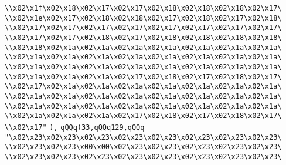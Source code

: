 \verb|\\x02\x1f\x02\x18\x02\x17\x02\x17\x02\x18\x02\x18\x02\x18\x02\x17\|\newline
\verb|\\x02\x1e\x02\x17\x02\x18\x02\x18\x02\x17\x02\x18\x02\x17\x02\x18\|\newline
\verb|\\x02\x17\x02\x17\x02\x17\x02\x17\x02\x17\x02\x17\x02\x17\x02\x17\|\newline
\verb|\\x02\x17\x02\x17\x02\x18\x02\x17\x02\x18\x02\x18\x02\x18\x02\x18\|\newline
\verb|\\x02\x18\x02\x1a\x02\x1a\x02\x1a\x02\x1a\x02\x1a\x02\x1a\x02\x1a\|\newline
\verb|\\x02\x1a\x02\x1a\x02\x1a\x02\x1a\x02\x1a\x02\x1a\x02\x1a\x02\x1a\|\newline
\verb|\\x02\x1a\x02\x1a\x02\x1a\x02\x1a\x02\x1a\x02\x1a\x02\x1a\x02\x1a\|\newline
\verb|\\x02\x1a\x02\x1a\x02\x1a\x02\x17\x02\x18\x02\x17\x02\x18\x02\x17\|\newline
\verb|\\x02\x17\x02\x1a\x02\x1a\x02\x1a\x02\x1a\x02\x1a\x02\x1a\x02\x1a\|\newline
\verb|\\x02\x1a\x02\x1a\x02\x1a\x02\x1a\x02\x1a\x02\x1a\x02\x1a\x02\x1a\|\newline
\verb|\\x02\x1a\x02\x1a\x02\x1a\x02\x1a\x02\x1a\x02\x1a\x02\x1a\x02\x1a\|\newline
\verb|\\x02\x1a\x02\x1a\x02\x1a\x02\x17\x02\x18\x02\x17\x02\x18\x02\x17\|\newline
\verb|\\x02\x17"|\newline
\verb|),|\newline
\verb|qQQq(33,qQQq129,qQQq|\newline
\verb|"\x02\x23\x02\x23\x02\x23\x02\x23\x02\x23\x02\x23\x02\x23\x02\x23\|\newline
\verb|\\x02\x23\x02\x23\x00\x00\x02\x23\x02\x23\x02\x23\x02\x23\x02\x23\|\newline
\verb|\\x02\x23\x02\x23\x02\x23\x02\x23\x02\x23\x02\x23\x02\x23\x02\x23\|\newline
